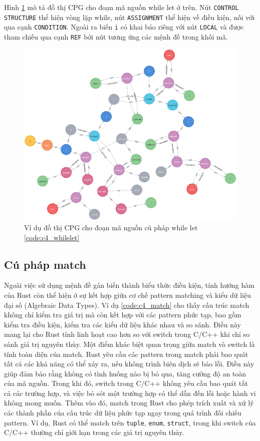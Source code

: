 Hình \ref{img:c4_cpg_whilelet} mô tả đồ thị CPG cho đoạn mã nguồn while let ở trên. Nút \texttt{CONTROL STRUCTURE} thể hiện vòng lặp while, nút \texttt{ASSIGNMENT} thể hiện về điều kiện, nối với qua cạnh \texttt{CONDITION}. Ngoài ra biến \texttt{i} có khai báo riêng với nút \texttt{LOCAL} và được tham chiếu qua cạnh \texttt{REF} bởi nút tương ứng các mệnh đề trong khối mã.

\begin{figure}[H]
    \includegraphics[width=1\columnwidth]{figures/c4/c4_whilelet.png}
    \centering
    \caption{Ví dụ đồ thị CPG cho đoạn mã nguồn cú pháp while let \ref{code:c4_whilelet}}
    \label{img:c4_cpg_whilelet}
\end{figure}

\subsection{Cú pháp match}

Ngoài việc sử dụng mệnh đề gán biến thành biểu thức điều kiện, tính hướng hàm của Rust còn thể hiện ở sự kết hợp giữa cơ chế pattern matching và kiểu dữ liệu đại số (Algebraic Data Types).
Ví dụ \ref{code:c4_match} cho thấy cấu trúc match không chỉ kiểm tra giá trị mà còn kết hợp với các pattern phức tạp, bao gồm kiểm tra điều kiện, kiểm tra các kiểu dữ liệu khác nhau và so sánh.
Điều này mang lại cho Rust tính linh hoạt cao hơn so với switch trong C/C++ khi chỉ so sánh giá trị nguyên thủy.
Một điểm khác biệt quan trọng giữa match và switch là tính toàn diện của match.
Rust yêu cầu các pattern trong match phải bao quát tất cả các khả năng có thể xảy ra, nếu không trình biên dịch sẽ báo lỗi.
Điều này giúp đảm bảo rằng không có tình huống nào bị bỏ qua, tăng cường độ an toàn của mã nguồn.
Trong khi đó, switch trong C/C++ không yêu cầu bao quát tất cả các trường hợp, và việc bỏ sót một trường hợp có thể dẫn đến lỗi hoặc hành vi không mong muốn.
Thêm vào đó, match trong Rust cho phép trích xuất và xử lý các thành phần của cấu trúc dữ liệu phức tạp ngay trong quá trình đối chiếu pattern.
Ví dụ, Rust có thể match trên \texttt{tuple}, \texttt{enum}, \texttt{struct}, trong khi switch của C/C++ thường chỉ giới hạn trong các giá trị nguyên thủy.

